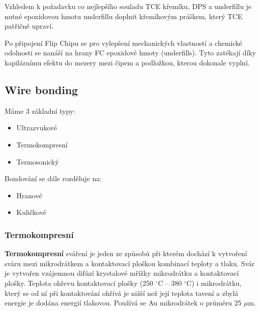 Vzhledem k požadavku co nejlepšího souladu TCE křemíku, DPS a underfillu je nutné epoxidovou hmotu underfillu doplnit křemíkovým práškem, který TCE patřičně upraví.

Po připojení Flip Chipu se pro vylepšení mechanických vlastností a chemické odolnosti se nanáší na hrany FC epoxidové hmoty (underfills). Tyto zatékají díky kapilárnímu efektu do mezery mezi čipem a podložkou, kterou dokonale vyplní.

\subsection{Wire bonding}
Máme 3 základní typy:
\begin{itemize}
\item Ultrazvukové
\item Termokompresní
\item Termosonický
\end{itemize}

Bondování se dále rozděluje na:
\begin{itemize}
\item Hranové
\item Kuličkové
\end{itemize}

\subsubsection{Termokompresní}
\textbf{Termokompresní} sváření je jeden ze způsobů při kterém dochází k vytvoření sváru mezi mikrodrátkem a kontaktovací ploškou kombinací teploty a tlaku. Svár je vytvořen vzájemnou difůzí krystalové mřížky mikrodrátku a kontaktovací plošky. Teplota ohřevu kontaktovací plošky (250 $^{\circ}$C – 380 $^{\circ}$C) i mikrodrátku, který se od ní při kontaktování ohřívá je nižší než její teplota tavení a zbylá energie je dodána energií tlakovou. Používá se Au mikrodrátek o průměru 25 $\mu$m.

